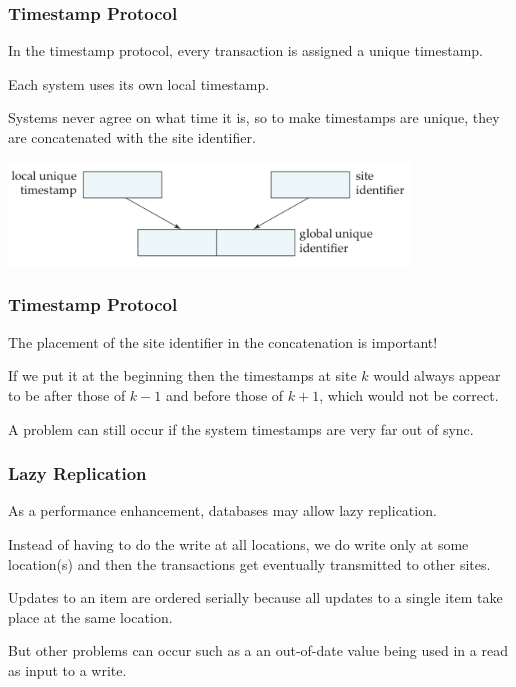 \begin{frame}
\frametitle{Timestamp Protocol}

In the timestamp protocol, every transaction is assigned a unique timestamp. 

Each system uses its own local timestamp. 

Systems never agree on what time it is, so to make timestamps are unique, they are concatenated with the site identifier.

\begin{center}
\includegraphics[width=0.8\textwidth]{images/ddb-timestamp}
\end{center}

\end{frame}

\begin{frame}
\frametitle{Timestamp Protocol}
The placement of the site identifier in the concatenation is important! 

If we put it at the beginning then the timestamps at site $k$ would always appear to be after those of $k-1$ and before those of $k+1$, which would not be correct. 

A problem can still occur if the system timestamps are very far out of sync.

\end{frame}

\begin{frame}
\frametitle{Lazy Replication}
As a performance enhancement, databases may allow lazy replication.

Instead of having to do the write at all locations, we do write only at some location(s) and then the transactions get eventually transmitted to other sites.

Updates to an item are ordered serially because all updates to a single item take place at the same location. 

But other problems can occur such as a an out-of-date value being used in a read as input to a write.

\end{frame}

